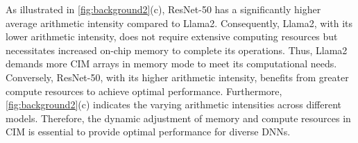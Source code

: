 As illustrated in \fig \ref{fig:background2}(c), ResNet-50 has a significantly higher average arithmetic intensity compared to Llama2. %
Consequently, Llama2, with its lower arithmetic intensity, does not require extensive computing resources but necessitates increased on-chip memory to complete its operations. 
Thus, Llama2 demands more CIM arrays in memory mode to meet its computational needs. Conversely, ResNet-50, with its higher arithmetic intensity, benefits from greater compute resources to achieve optimal performance.
Furthermore, \fig \ref{fig:background2}(c) indicates the varying arithmetic intensities across different models. 
Therefore, the dynamic adjustment of memory and compute resources in CIM is essential to provide optimal performance for diverse DNNs.
\begin{comment}


This phenomenon is consistent with the arithmetic intensity of the network, defined as the ratio of the amount of computation to the amount of input data.
ResNet-50 has a much higher arithmetic intensity compared to Llama2. 
Consequently, Llama2 requires more CIM arrays in memory mode than ResNet-50 under the same total number of CIM arrays. 


\end{comment}
